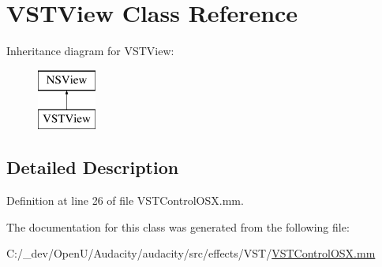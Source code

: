 \hypertarget{interface_v_s_t_view}{}\section{V\+S\+T\+View Class Reference}
\label{interface_v_s_t_view}
Inheritance diagram for V\+S\+T\+View\+:\begin{figure}[H]
\begin{center}
\leavevmode
\includegraphics[height=2.000000cm]{interface_v_s_t_view}
\end{center}
\end{figure}


\subsection{Detailed Description}


Definition at line 26 of file V\+S\+T\+Control\+O\+S\+X.\+mm.



The documentation for this class was generated from the following file\+:\begin{DoxyCompactItemize}
\item 
C\+:/\+\_\+dev/\+Open\+U/\+Audacity/audacity/src/effects/\+V\+S\+T/\hyperlink{_v_s_t_control_o_s_x_8mm}{V\+S\+T\+Control\+O\+S\+X.\+mm}\end{DoxyCompactItemize}
